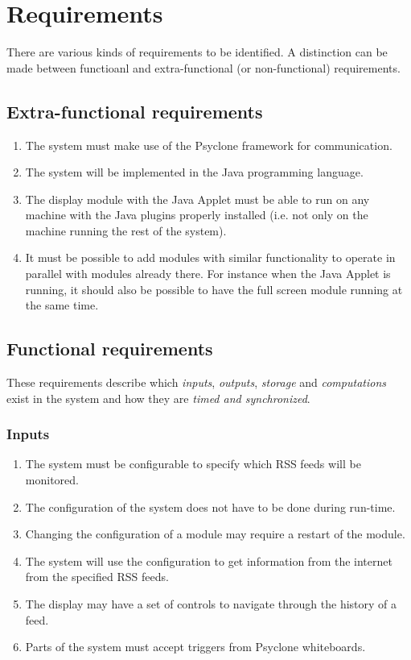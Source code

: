 \chapter{\label{cpt:requirements}Requirements}

There are various kinds of requirements to be identified. A distinction can be
made between functioanl and extra-functional (or non-functional) requirements.

\section{Extra-functional requirements}

\begin{enumerate}
  \item The system must make use of the Psyclone framework for communication.
  \item The system will be implemented in the Java programming language.
  \item The display module with the Java Applet must be able to run on any
        machine with the Java plugins properly installed (i.e. not only on the
        machine running the rest of the system).
  \item It must be possible to add modules with similar functionality to
        operate in parallel with modules already there. For instance when the
        Java Applet is running, it should also be possible to have the full
        screen module running at the same time. 
\end{enumerate}

\section{Functional requirements}

These requirements describe which \emph{inputs}, \emph{outputs}, \emph{storage}
and \emph{computations} exist in the system and how they are \emph{timed and
synchronized}.

\subsection{Inputs}

\begin{enumerate}
  \item The system must be configurable to specify which RSS feeds will be
        monitored.
  \item The configuration of the system does not have to be done during run-time.
  \item Changing the configuration of a module may require a restart of the
        module.
  \item The system will use the configuration to get information from the
        internet from the specified RSS feeds.
  \item The display may have a set of controls to navigate through the history
        of a feed.
  \item Parts of the system must accept triggers from Psyclone whiteboards.
\end{enumerate}

